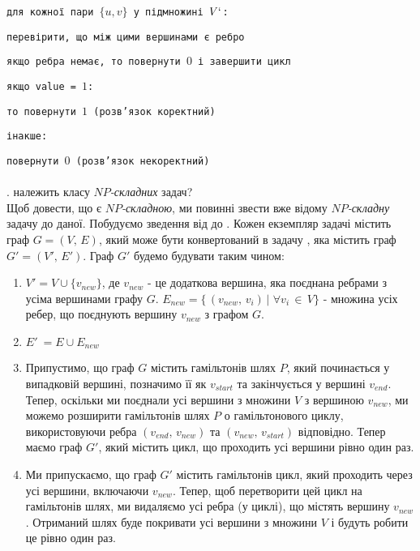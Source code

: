 \documentclass[14pt]{article}
\begin{document}
\begin{spacing}{1.175}
        \quad \texttt{для кожної пари \( \{u, v\}\) у підмножині \(V`\):}
        
        \quad \texttt{\quad перевірити, що між цими вершинами є ребро}
        
        \quad \texttt{\quad якщо ребра немає, то повернути \(0\) і завершити цикл}
        
        \quad \texttt{якщо value = \(1\):}
        
        \quad \texttt{\quad то повернути \(1\) (розв'язок коректний)}
        
        \quad \texttt{інакше:}
        
        \quad \texttt{\quad повернути \(0\) (розв'язок некоректний)}\\

        
        \\
        . \hamcycle\hspace{0.05cm} належить класу \(NP\)\textit{-складних }задач? \\
        Щоб довести, що \hamcycle\hspace{0.05cm} є \(NP\)\textit{-складною}, ми повинні звести вже відому \(NP\)\textit{-складну} задачу до даної. Побудуємо зведення від \dhampath\hspace{0.05cm} до \hamcycle. Кожен екземпляр задачі \dhampath\hspace{0.05cm} містить граф \(G = (V,\,E) \), який може бути конвертований в задачу \hamcycle, яка містить граф \(G' = (V',\,E')\). Граф \(G'\) будемо будувати таким чином:
        \begin{enumerate}
            \item \(V' = V \cup \{v_{new}\}\), де \(v_{new}\) - це додаткова вершина, яка поєднана ребрами з усіма вершинами графу \(G\). \(E_{new} = \{\,(v_{new},\,v_i)\,|\,\,\forall v_i\,\in\,V\}\) - множина усіх ребер, що поєднують вершину \(v_{new}\) з графом \(G\).
            \item \(E'\ = E \cup E_{new}\) 
            \item Припустимо, що граф \(G\) містить гамільтонів шлях \(P\), який починається у випадковій вершині, позначимо її як \(v_{start}\) та закінчується у вершині \(v_{end}\). Тепер, оскільки ми поєднали усі вершини з множини \(V\) з вершиною \(v_{new}\), ми можемо розширити гамільтонів шлях \(P\) о гамільтонового циклу, використовуючи ребра \((v_{end},\, v_{new})\) та \((v_{new},\, v_{start})\) відповідно. Тепер маємо граф \(G'\), який містить цикл, що проходить усі вершини рівно один раз.
            \item Ми припускаємо, що граф \(G'\) містить гамільтонів цикл, який проходить через усі вершини, включаючи \(v_{new}\). Тепер, щоб перетворити цей цикл на гамільтонів шлях, ми видаляємо усі ребра (у циклі), що містять вершину \(v_{new}\). Отриманий шлях буде покривати усі вершини з множини \(V\) і будуть робити це рівно один раз.
        \end{enumerate}
        

\end{spacing}
\end{document}

